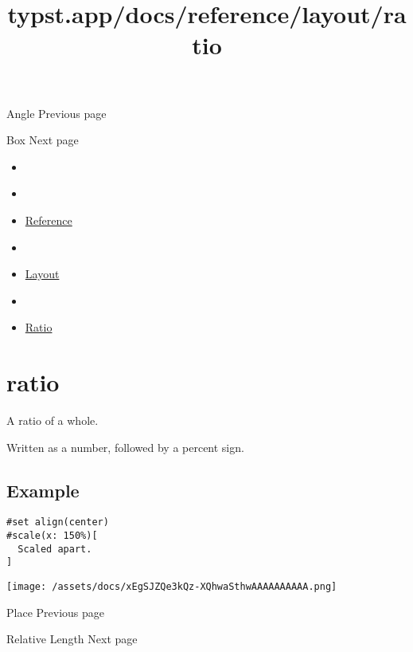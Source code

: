 { Angle } { Previous page }

\href{/docs/reference/layout/box/}{\pandocbounded{}}

{ Box } { Next page }


\title{typst.app/docs/reference/layout/ratio}

\begin{itemize}
\tightlist
\item
  \href{/docs}{}
\item
  
\item
  \href{/docs/reference/}{Reference}
\item
  
\item
  \href{/docs/reference/layout/}{Layout}
\item
  
\item
  \href{/docs/reference/layout/ratio/}{Ratio}
\end{itemize}

\section{\texorpdfstring{{ ratio }}{ ratio }}\label{summary}

A ratio of a whole.

Written as a number, followed by a percent sign.

\subsection{Example}\label{example}

\begin{verbatim}
#set align(center)
#scale(x: 150%)[
  Scaled apart.
]
\end{verbatim}

\texttt{[image: /assets/docs/xEgSJZQe3kQz-XQhwaSthwAAAAAAAAAA.png]}

\href{/docs/reference/layout/place/}{\pandocbounded{}}

{ Place } { Previous page }

\href{/docs/reference/layout/relative/}{\pandocbounded{}}

{ Relative Length } { Next page }


